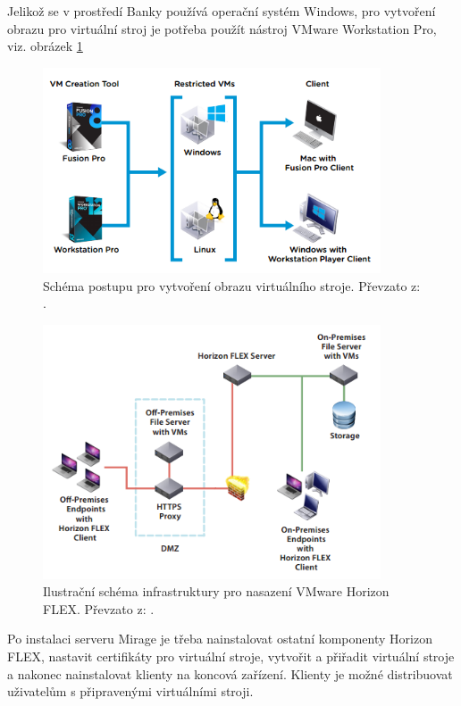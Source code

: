 Jelikož se v prostředí Banky používá operační systém Windows, pro vytvoření obrazu pro virtuální stroj je potřeba použít nástroj VMware Workstation Pro, viz. obrázek \ref{workstation}

\begin{figure}[h!]
\centering
\includegraphics[width=10cm]{img/workstation}
\caption{Schéma postupu pro vytvoření obrazu virtuálního stroje. Převzato z: \cite{FlexDeployment}.}
\label{workstation}
\end{figure}




\begin{figure}[h!]
\centering
\includegraphics[width=10cm]{img/schemaArchitektury}
\caption{Ilustrační schéma infrastruktury pro nasazení VMware Horizon FLEX. Převzato z: \cite{FlexDeployment}.}\label{schemaArchitektury}
\end{figure} 


Po instalaci serveru Mirage je třeba nainstalovat ostatní komponenty Horizon FLEX, nastavit certifikáty pro virtuální stroje, vytvořit a přiřadit virtuální stroje a nakonec nainstalovat klienty na koncová zařízení. Klienty je možné distribuovat uživatelům s připravenými virtuálními stroji. 

